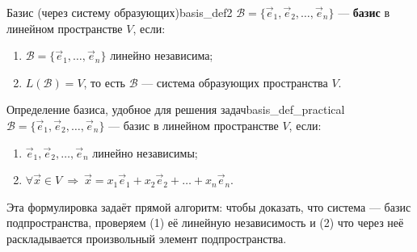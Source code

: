 \documentclass[12pt,a4paper]{article}
\begin{document}
\begin{definition}{Базис (через систему образующих)}{basis_def2}
  $\mathcal{B} = \{\vec{e}_1, \vec{e}_2, \dots, \vec{e}_n\}$ ---
  \textbf{базис} в линейном пространстве $V$, если:
  \begin{enumerate}
    \item $\mathcal{B} = \{\vec{e}_1, \dots, \vec{e}_n\}$ линейно
      независима;
    \item $L(\mathcal{B}) = V$, то есть $\mathcal{B}$ --- система
      образующих пространства $V$.
  \end{enumerate}
\end{definition}

\begin{definition}{Определение базиса, удобное для решения
  задач}{basis_def_practical}
  $\mathcal{B} = \{\vec{e}_1, \vec{e}_2, \dots, \vec{e}_n\}$ ---
  базис в линейном пространстве $V$, если:
  \begin{enumerate}
    \item $\vec{e}_1, \vec{e}_2, \dots, \vec{e}_n$ линейно независимы;
    \item $\forall \vec{x} \in V \ \Rightarrow \ \vec{x} =
      x_1\vec{e}_1 + x_2\vec{e}_2 + \dots + x_n\vec{e}_n$.
  \end{enumerate}
\end{definition}

Эта формулировка задаёт прямой алгоритм: чтобы доказать, что система ---
базис подпространства, проверяем (1) её линейную независимость и
(2) что через неё раскладывается произвольный элемент подпространства.
\end{document}
